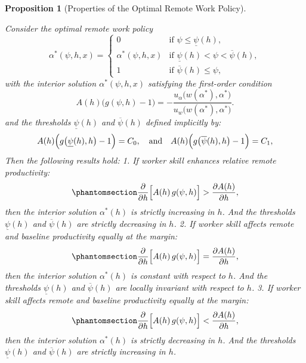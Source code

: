 \documentclass[
  11pt,
  letterpaper,
  DIV=11,
  numbers=noendperiod]{scrartcl}
\theoremstyle{plain}
\newtheorem{proposition}{Proposition}[section]
\theoremstyle{remark}
\begin{document}
\begin{proposition}[Properties of the Optimal Remote Work
Policy]\protect\hypertarget{prp-optimal-remote-policy-general}{}\label{prp-optimal-remote-policy-general}

Consider the optimal remote work policy \[\alpha^*(\psi,h,x)=
\begin{cases}
0 & \text{if } \psi \le \underline{\psi}(h), \\
\alpha^*(\psi,h,x) & \text{if } \underline{\psi}(h) < \psi < \overline{\psi}(h), \\
1 & \text{if } \overline{\psi}(h) \le \psi,
\end{cases}
\] with the interior solution \(\alpha^*(\psi,h,x)\) satisfying the
first-order condition
\[A(h)\bigl(g(\psi,h)-1\bigr) = -\frac{u_\alpha\bigl(w(\alpha^*),\alpha^*\bigr)}{u_w\bigl(w(\alpha^*),\alpha^*\bigr)}.\]
and the thresholds \(\underline{\psi}(h)\) and \(\overline{\psi}(h)\)
defined implicitly by:\[
A(h)\Bigl(g\bigl(\underline{\psi}(h),h\bigr) -1\Bigr) =  C_{0}, \quad \text{and} \quad
A(h)\Bigl(g\bigl(\overline{\psi}(h),h\bigr) -1\Bigr) =  C_{1},
\]Then the following results hold: 1. If worker skill enhances relative
remote
productivity:\begin{equation}\phantomsection\label{eq-condition-1-prop-monotonicity}{
   \frac{\partial}{\partial h}\Bigl[A(h)\,g(\psi,h)\Bigr] > \frac{\partial A(h)}{\partial h},
       }\end{equation} then the interior solution \(\alpha^*(h)\) is
\emph{strictly increasing} in \(h\). And the thresholds
\(\underline{\psi}(h)\) and \(\overline{\psi}(h)\) are \emph{strictly
decreasing} in \(h\). 2. If worker skill affects remote and baseline
productivity equally at the
margin:\begin{equation}\phantomsection\label{eq-condition-2-prop-monotonicity}{
     \frac{\partial}{\partial h}\Bigl[A(h)\,g(\psi,h)\Bigr] = \frac{\partial A(h)}{\partial h},}\end{equation}
then the interior solution \(\alpha^*(h)\) is \emph{constant} with
respect to \(h\). And the thresholds \(\underline{\psi}(h)\) and
\(\overline{\psi}(h)\) are \emph{locally invariant} with respect to
\(h\). 3. If worker skill affects remote and baseline productivity
equally at the
margin:\begin{equation}\phantomsection\label{eq-condition-3-prop-monotonicity}{
     \frac{\partial}{\partial h}\Bigl[A(h)\,g(\psi,h)\Bigr] < \frac{\partial A(h)}{\partial h},}\end{equation}
then the interior solution \(\alpha^*(h)\) is \emph{strictly decreasing}
in \(h\). And the thresholds \(\underline{\psi}(h)\) and
\(\overline{\psi}(h)\) are \emph{strictly increasing} in \(h\).

\end{proposition}
\end{document}
